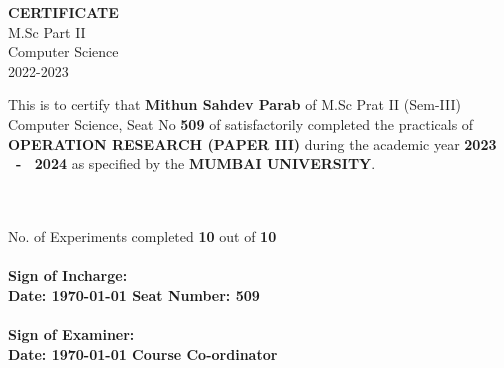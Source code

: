 \begin{center}

    \end{center}
    \begin{center}
    \textbf{ \uppercase{ \Large{CERTIFICATE} \\}}
     \hspace{0.22cm} M.Sc Part II \\
    \hspace{0.22cm} Computer Science \\
    \hspace{0.22cm} 2022-2023 \\
    \end{center}
    \vspace{1cm}
    \begin{center}
            \begin{minipage}{42em}
    \hspace{1.5cm} This is to certify that \textbf{Mithun Sahdev Parab} of M.Sc Prat II (Sem-III) Computer Science, Seat No \textbf{509} of satisfactorily completed the practicals of \textbf{\uppercase{Operation Research (Paper III)}} during the academic year \textbf{2023 \ - \ 2024} as specified by the \textbf{\uppercase{Mumbai University}}.
    \end{minipage}
    \end{center}
\hspace{0.7cm}
\\\\
No. of Experiments completed \hspace{0.25cm} \textbf{10} \hspace{0.25cm} out of \hspace{0.25cm} \textbf{10} \hspace{0.25cm}
    \\\\
    \textbf{
    Sign of Incharge: \\
    \hspace{1.5cm}Date: \today        \hspace{5.6cm} \textbf{Seat Number: 509}
    \\\\
    Sign of Examiner: \\
    \hspace{1.5cm}Date:  \today			\hspace{5.5cm}			 Course Co-ordinator}
    
